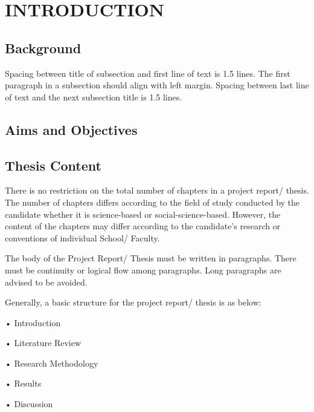 \documentclass[12pt, a4paper]{report}
\begin{document}
	\chapter{\textbf{INTRODUCTION}}{

		\begin{flushleft}
			\section{Background}{
				Spacing between title of subsection and first line of text is 1.5 lines. The first paragraph in a subsection should align with left margin.
				Spacing between last line of text and the next subsection title is 1.5 lines.
			}
		\end{flushleft}
		
		\begin{flushleft}
			\section{Aims and Objectives}{
			}
		\end{flushleft}
		
		\begin{flushleft}
			\section{Thesis Content}{
				There is no restriction on the total number of chapters in a project report/ thesis. The number of chapters differs according to the field of study conducted by the candidate whether it is science-based or social-science-based. However, the content of the chapters may differ according to the candidate's research or conventions of individual School/ Faculty.
				
				The body of the Project Report/ Thesis must be written in paragraphs. There must be continuity or logical flow among paragraphs. Long paragraphs are advised to be avoided.
				
				Generally, a basic structure for the project report/ thesis is as below:
				
				•	Introduction
				
				•	Literature Review
				
				•	Research Methodology
				
				•	Results
				
				•	Discussion
				
}
\end{flushleft}}
\end{document}
